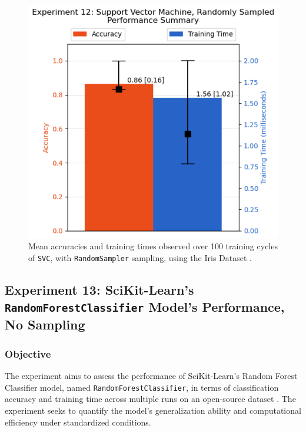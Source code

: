\documentclass{article}
\theoremstyle{plain}
\theoremstyle{definition}
\theoremstyle{remark}
\begin{document}
\begin{figure}[ht]
	\vskip 0.2in
	\begin{center}
		\centerline{\includegraphics[width=\columnwidth]{experiment_12}}
		\caption{Mean accuracies and training times observed over 100 training cycles of \texttt{SVC}, with \texttt{RandomSampler} sampling, using the Iris Dataset \cite{iris}.}
		\label{experiment_12}
	\end{center}
	\vskip -0.2in
\end{figure}


\subsection{Experiment 13: SciKit-Learn's \texttt{RandomForestClassifier} Model's Performance, No Sampling}

\subsubsection{Objective}

The experiment aims to assess the performance of SciKit-Learn's Random Forest Classifier model, named \texttt{RandomForestClassifier}, in terms of classification accuracy and training time across multiple runs on an open-source dataset \cite{wine}. The experiment seeks to quantify the model's generalization ability and computational efficiency under standardized conditions.
\end{document}
